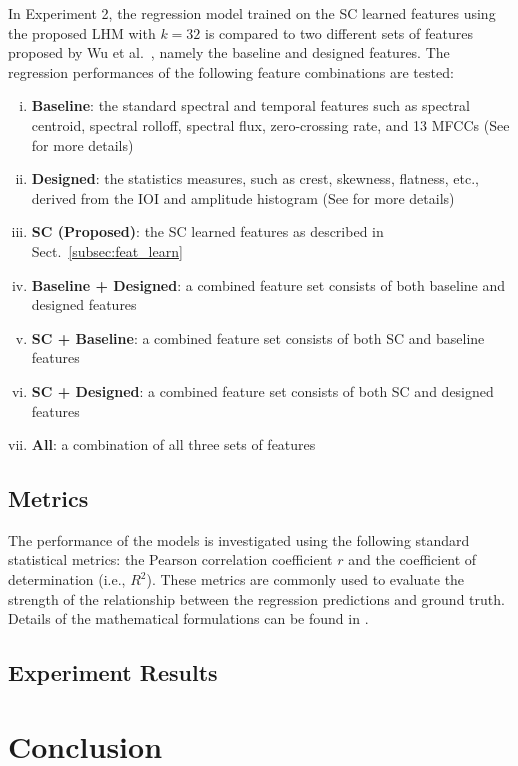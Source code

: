 \documentclass{article}
\begin{document}
In Experiment 2, the regression model trained on the SC learned features using the proposed LHM with $k = 32$ is compared to two different sets of features proposed by Wu et al.~\cite{Wu2016}, namely the baseline and designed features. The regression performances of the following feature combinations are tested:
\begin{enumerate}[(i)]
\item \textbf{Baseline}: the standard spectral and temporal features such as spectral centroid, spectral rolloff, spectral flux, zero-crossing rate, and 13 MFCCs (See \cite{Wu2016} for more details)
\item \textbf{Designed}: the statistics measures, such as crest, skewness, flatness, etc., derived from the IOI and amplitude histogram (See \cite{Wu2016} for more details)
\item \textbf{SC (Proposed)}: the SC learned features as described in Sect.~\ref{subsec:feat_learn}
\item \textbf{Baseline + Designed}: a combined feature set consists of both baseline and designed features 
\item \textbf{SC + Baseline}:  a combined feature set consists of both SC and baseline features 
\item \textbf{SC + Designed}:  a combined feature set consists of both SC and designed features 
\item \textbf{All}: a combination of all three sets of features
\end{enumerate}

\subsection{Metrics}
The performance of the models is investigated using the following standard statistical metrics: the Pearson correlation coefficient $r$ and the coefficient of determination (i.e., $R^{2}$). These metrics are commonly used to evaluate the strength of the relationship between the regression predictions and ground truth. Details of the mathematical formulations can be found in \cite{McClave2003}.

\subsection{Experiment Results}









\section{Conclusion}\label{sec:conclusion}




\end{document}
